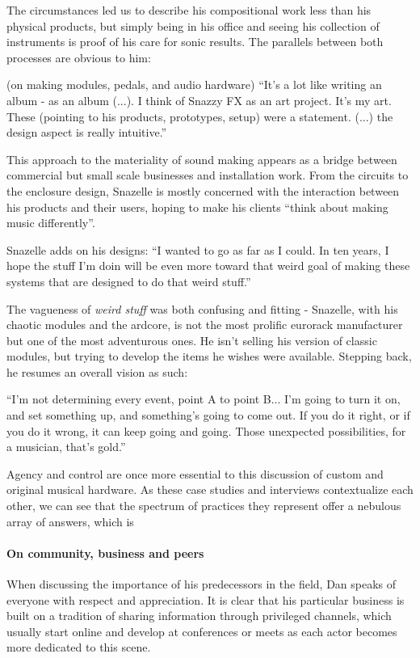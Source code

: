 The circumstances led us to describe his compositional work less than his physical products, but simply being in his office and seeing his collection of instruments is proof of his care for sonic results. The parallels between both processes are obvious to him: 

(on making modules, pedals, and audio hardware) ``It's a lot like writing an album - as an album (...). I think of Snazzy FX as an art project. It's my art. These (pointing to his products, prototypes, setup) were a statement. (...) the design aspect is really intuitive.''

This approach to the materiality of sound making appears as a bridge between commercial but small scale businesses and installation work. From the circuits to the enclosure design, Snazelle is mostly concerned with the interaction between his products and their users, hoping to make his clients ``think about making music differently''. 

Snazelle adds on his designs: ``I wanted to go as far as I could. In ten years, I hope the stuff I'm doin will be even more toward that weird goal of making these systems that are designed to do that weird stuff.''

The vagueness of \emph{weird stuff} was both confusing and fitting - Snazelle, with his chaotic modules and the ardcore, is not the most prolific eurorack manufacturer but one of the most adventurous ones. He isn't selling his version of classic modules, but trying to develop the items he wishes were available. Stepping back, he resumes an overall vision as such: 

``I'm not determining every event, point A to point B... I'm going to turn it on, and set something up, and something's going to come out. If you do it right, or if you do it wrong, it can keep going and going. Those unexpected possibilities, for a musician, that's gold.''

Agency and control are once more essential to this discussion of custom and original musical hardware. As these case studies and interviews contextualize each other, we can see that the spectrum of practices they represent offer a nebulous array of answers, which is 

\paragraph{On community, business and peers}

When discussing the importance of his predecessors in the field, Dan speaks of everyone with respect and appreciation. It is clear that his particular business is built on a tradition of sharing information through privileged channels, which usually start online and develop at conferences or meets as each actor becomes more dedicated to this scene. 

